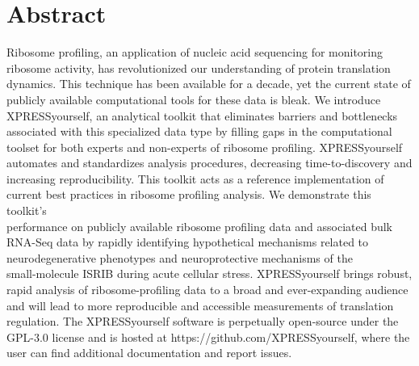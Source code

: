 \documentclass[10pt, oneside]{article}
\begin{document}
\section*{Abstract}
\noindent
Ribosome profiling, an application of nucleic acid sequencing for monitoring ribosome activity, has revolutionized our understanding of protein translation dynamics. This technique has been available for a decade, yet the current state of publicly available computational tools for these data is bleak. We introduce XPRESSyourself, an analytical toolkit that eliminates barriers and bottlenecks associated with this specialized data type by filling gaps in the computational toolset for both experts and non-experts of ribosome profiling. XPRESSyourself automates and standardizes analysis procedures, decreasing time-to-discovery and increasing reproducibility. This toolkit acts as a reference implementation of current best practices in ribosome profiling analysis. We demonstrate this toolkit's \\performance on publicly available ribosome profiling data and associated bulk RNA-Seq data by rapidly identifying hypothetical mechanisms related to neurodegenerative phenotypes and neuroprotective mechanisms of the \\small-molecule ISRIB during acute cellular stress. XPRESSyourself brings robust, rapid analysis of ribosome-profiling data to a broad and ever-expanding audience and will lead to more reproducible and accessible measurements of translation regulation. The XPRESSyourself software is perpetually open-source under the GPL-3.0 license and is hosted at https://github.com/XPRESSyourself, where the user can find additional documentation and report issues.\\

\end{document}
